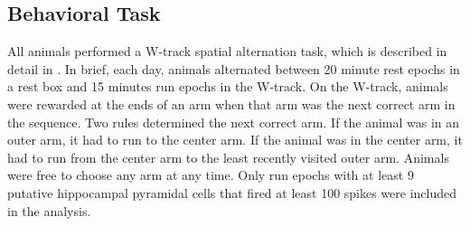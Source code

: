 \documentclass[times, twoside]{zHenriquesLab-StyleBioRxiv}
\begin{document}
\subsection*{Behavioral Task}
All animals performed a W-track spatial alternation task, which is described in detail in \cite{KarlssonAwakereplayremote2009}. In brief, each day, animals alternated between 20 minute rest epochs in a rest box and 15 minutes run epochs in the W-track. On the W-track, animals were rewarded at the ends of an arm when that arm was the next correct arm in the sequence. Two rules determined the next correct arm. If the animal was in an outer arm, it had to run to the center arm. If the animal was in the center arm, it had to run from the center arm to the least recently visited outer arm. Animals were free to choose any arm at any time. Only run epochs with at least 9 putative hippocampal pyramidal cells that fired at least 100 spikes were included in the analysis.
\end{document}
